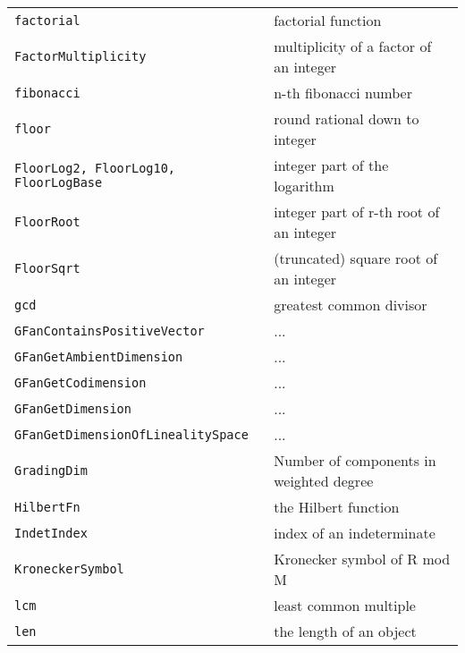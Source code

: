 \documentclass[a4paper]{mybook}
\begin{document}
\begin{center}
\begin{longtable}{ll}
{\verb~factorial~} &
      factorial function\\
   
{\verb~FactorMultiplicity~} &
      multiplicity of a factor of an integer\\
   
{\verb~fibonacci~} &
      n-th fibonacci number\\
   
{\verb~floor~} &
      round rational down to integer\\
   
{\verb~FloorLog2, FloorLog10, FloorLogBase~} &
      integer part of the logarithm\\
   
{\verb~FloorRoot~} &
      integer part of r-th root of an integer\\
   
{\verb~FloorSqrt~} &
      (truncated) square root of an integer\\
   
{\verb~gcd~} &
      greatest common divisor\\
   
{\verb~GFanContainsPositiveVector~} &
      ...\\
   
{\verb~GFanGetAmbientDimension~} &
      ...\\
   
{\verb~GFanGetCodimension~} &
      ...\\
   
{\verb~GFanGetDimension~} &
      ...\\
   
{\verb~GFanGetDimensionOfLinealitySpace~} &
      ...\\
   
{\verb~GradingDim~} &
      Number of components in weighted degree\\
   
{\verb~HilbertFn~} &
      the Hilbert function\\
   
{\verb~IndetIndex~} &
      index of an indeterminate\\
   
{\verb~KroneckerSymbol~} &
      Kronecker symbol of R mod M\\
   
{\verb~lcm~} &
      least common multiple\\
   
{\verb~len~} &
      the length of an object\\
   

\end{longtable}
\end{center}
\end{document}
